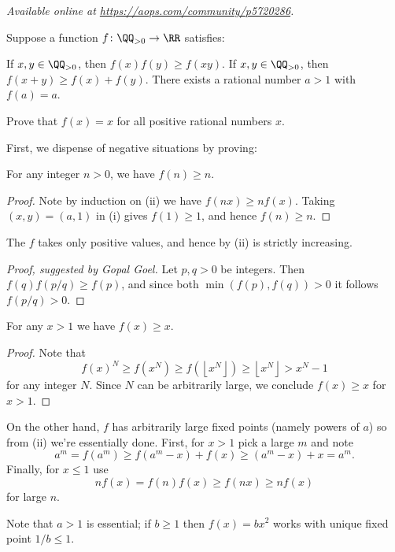 \textsl{Available online at \url{https://aops.com/community/p5720286}.}
\begin{mdframed}[style=mdpurplebox,frametitle={Problem statement}]
Suppose a function $f \colon \QQ_{>0} \to \RR$ satisfies:
\begin{enumerate}
  \ii [(i)] If $x,y \in \QQ_{>0}$, then $f(x)f(y) \ge f(xy)$.
  \ii [(ii)] If $x,y \in \QQ_{>0}$, then $f(x+y) \ge f(x) + f(y)$.
  \ii [(iii)] There exists a rational number $a > 1$ with $f(a) = a$.
\end{enumerate}
Prove that $f(x) = x$ for all positive rational numbers $x$.
\end{mdframed}
First, we dispense of negative situations by proving:
\begin{claim*}
  For any integer $n > 0$, we have $f(n) \ge n$.
\end{claim*}
\begin{proof}
  Note by induction on (ii) we have $f(nx) \ge n f(x)$.
  Taking $(x,y) = (a,1)$ in (i) gives $f(1) \ge 1$,
  and hence $f(n) \ge n$.
\end{proof}

\begin{claim*}
  The $f$ takes only positive values,
  and hence by (ii) is strictly increasing.
\end{claim*}
\begin{proof}[Proof, suggested by Gopal Goel]
  Let $p,q > 0$ be integers.
  Then $f(q) f(p/q) \ge f(p)$,
  and since both $\min(f(p), f(q)) > 0$
  it follows $f(p/q) > 0$.
\end{proof}

\begin{claim*}
  For any $x > 1$ we have $f(x) \ge x$.
\end{claim*}
\begin{proof}
  Note that
  \[ f(x)^N \ge f(x^N) \ge f\left( \left\lfloor x^N \right\rfloor \right)
    \ge \left\lfloor x^N \right\rfloor > x^N-1 \]
  for any integer $N$.
  Since $N$ can be arbitrarily large,
  we conclude $f(x) \ge x$ for $x > 1$.
\end{proof}

On the other hand, $f$ has arbitrarily large fixed points
(namely powers of $a$) so from (ii) we're essentially done.
First, for $x > 1$ pick a large $m$ and note
\[ a^m = f(a^m) \ge f(a^m-x) + f(x) \ge (a^m-x)+x = a^m. \]
Finally, for $x \le 1$ use
\[ nf(x) = f(n)f(x) \ge f(nx) \ge nf(x) \]
for large $n$.

\begin{remark*}
Note that $a > 1$ is essential;
if $b \ge 1$ then $f(x) = bx^2$ works with unique fixed point $1/b \le 1$.
\end{remark*}
\pagebreak